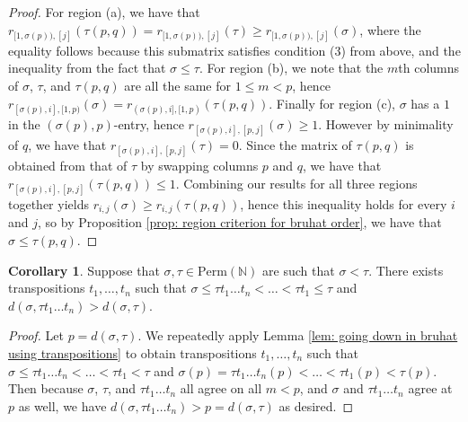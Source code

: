 \documentclass[oneside,11pt]{amsart}
\newcommand{\nn}{\ensuremath{\mathbb{N}}}
\newcommand{\Perm}{\ensuremath{\text{Perm}}}
\theoremstyle{definition}
\newtheorem{proof techniques}{Proof Techniques}
\newtheorem{corollary}{Corollary}
\begin{document}
\begin{proof}
For region (a), we have that $r_{[1 , \sigma(p) ),  [j]}(\tau ( p , q) ) = r_{[1 , \sigma(p) ),  [j]}(\tau ) \geq r_{[1 , \sigma(p) ),  [j]}(\sigma)$, where the equality follows because this submatrix satisfies condition (3) from above, and the inequality from the fact that $\sigma \leq \tau$. For region (b), we note that the $m$th columns of $\sigma$, $\tau$, and $\tau(p , q)$ are all the same for $1 \leq m < p$, hence $r_{ [\sigma(p) , i] , [1 , p)}(\sigma) = r_{ (\sigma(p) , i] , [1 , p)}(\tau(p , q))$. Finally for region (c), $\sigma$ has a $1$ in the $(\sigma(p) , p)$-entry, hence $r_{[ \sigma(p) , i] , [p , j] }(\sigma) \geq 1$. However by minimality of $q$, we have that $r_{[ \sigma(p) , i] , [p , j] }(\tau) = 0$. Since the matrix of $\tau(p , q)$ is obtained from that of $\tau$ by swapping columns $p$ and $q$, we have that $r_{[ \sigma(p) , i] , [p , j] }(\tau(p , q)) \leq 1$. Combining our results for all three regions together yields $r_{i , j}(\sigma) \geq r_{i ,j}(\tau(p , q))$, hence this inequality holds for every $i$ and $j$, so by Proposition \ref{prop: region criterion for bruhat order}, we have that $\sigma \leq \tau(p , q)$. 

\end{proof}


\begin{corollary}\label{cor: can make the support of a lower permutation smaller by applying transpositions}
Suppose that $\sigma, \tau \in \Perm(\nn)$ are such that $\sigma < \tau$. There exists transpositions $t_1,\ldots, t_n$ such that $\sigma \leq \tau t_1 \ldots t_n < \ldots < \tau t_1 \leq \tau$ and $d(\sigma ,  \tau  t_1 \ldots t_n) > d(\sigma , \tau)$.
\end{corollary}

\begin{proof}
Let $p= d(\sigma, \tau)$. We repeatedly apply Lemma \ref{lem: going down in bruhat using transpositions} to obtain transpositions $t_1, \ldots, t_n$ such that $\sigma \leq \tau t_1 \ldots t_n < \ldots < \tau t_1 < \tau$ and $\sigma(p) = \tau t_1 \ldots t_n(p) < \ldots < \tau t_1(p) < \tau(p)$. Then because $\sigma$, $\tau$, and $\tau t_1 \ldots t_n$ all agree on all $m < p$, and $\sigma$ and $\tau t_1 \ldots t_n$ agree at $p$ as well, we have $d(\sigma , \tau t_1 \ldots t_n) > p = d(\sigma , \tau)$ as desired. 
\end{proof}

\end{document}

